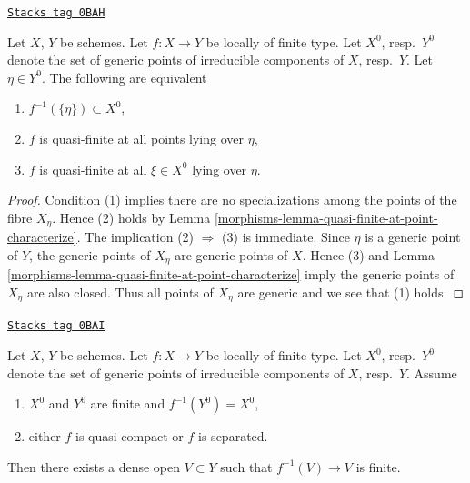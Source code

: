 \begin{lemma}
\label{morphisms-lemma-quasi-finiteness-over-generic-point}
\href{https://stacks.math.columbia.edu/tag/0BAH}{\texttt{Stacks tag 0BAH}}

Let $X$, $Y$ be schemes. Let $f : X \to Y$ be locally of finite type.
Let $X^0$, resp.\ $Y^0$ denote the set of generic points of irreducible
components of $X$, resp.\ $Y$. Let $\eta \in Y^0$. The following are
equivalent
\begin{enumerate}
\item $f^{-1}(\{\eta\}) \subset X^0$,
\item $f$ is quasi-finite at all points lying over $\eta$,
\item $f$ is quasi-finite at all $\xi \in X^0$ lying over $\eta$.
\end{enumerate}
\end{lemma}

\begin{proof}

Condition (1) implies there are no specializations among the points
of the fibre $X_\eta$. Hence (2) holds by
Lemma \ref{morphisms-lemma-quasi-finite-at-point-characterize}.
The implication (2) $\Rightarrow$ (3) is immediate.
Since $\eta$ is a generic point of $Y$, the generic points of $X_\eta$
are generic points of $X$. Hence (3) and
Lemma \ref{morphisms-lemma-quasi-finite-at-point-characterize}
imply the generic points of $X_\eta$ are also closed.
Thus all points of $X_\eta$ are generic and we see that (1) holds.
\end{proof}

\begin{lemma}
\label{morphisms-lemma-finite-over-dense-open}
\href{https://stacks.math.columbia.edu/tag/0BAI}{\texttt{Stacks tag 0BAI}}

Let $X$, $Y$ be schemes. Let $f : X \to Y$ be locally of finite type.
Let $X^0$, resp.\ $Y^0$ denote the set of generic points of irreducible
components of $X$, resp.\ $Y$. Assume
\begin{enumerate}
\item $X^0$ and $Y^0$ are finite and $f^{-1}(Y^0) = X^0$,
\item either $f$ is quasi-compact or $f$ is separated.
\end{enumerate}
Then there exists a dense open $V \subset Y$
such that $f^{-1}(V) \to V$ is finite.
\end{lemma}

